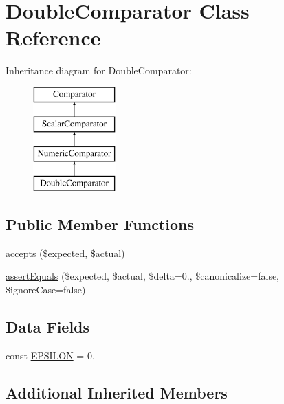 \hypertarget{class_sebastian_bergmann_1_1_comparator_1_1_double_comparator}{}\section{Double\+Comparator Class Reference}
\label{class_sebastian_bergmann_1_1_comparator_1_1_double_comparator}
Inheritance diagram for Double\+Comparator\+:\begin{figure}[H]
\begin{center}
\leavevmode
\includegraphics[height=4.000000cm]{class_sebastian_bergmann_1_1_comparator_1_1_double_comparator}
\end{center}
\end{figure}
\subsection*{Public Member Functions}
\begin{DoxyCompactItemize}
\item 
\mbox{\hyperlink{class_sebastian_bergmann_1_1_comparator_1_1_double_comparator_ae9bdf0cba02ce3470169280656cdeb84}{accepts}} (\$expected, \$actual)
\item 
\mbox{\hyperlink{class_sebastian_bergmann_1_1_comparator_1_1_double_comparator_adb3679ea06503114394431cb250ec5a4}{assert\+Equals}} (\$expected, \$actual, \$delta=0., \$canonicalize=false, \$ignore\+Case=false)
\end{DoxyCompactItemize}
\subsection*{Data Fields}
\begin{DoxyCompactItemize}
\item 
const \mbox{\hyperlink{class_sebastian_bergmann_1_1_comparator_1_1_double_comparator_a5593e0e1975e8ecac4f4b64ffe42d984}{E\+P\+S\+I\+L\+ON}} = 0.
\end{DoxyCompactItemize}
\subsection*{Additional Inherited Members}


